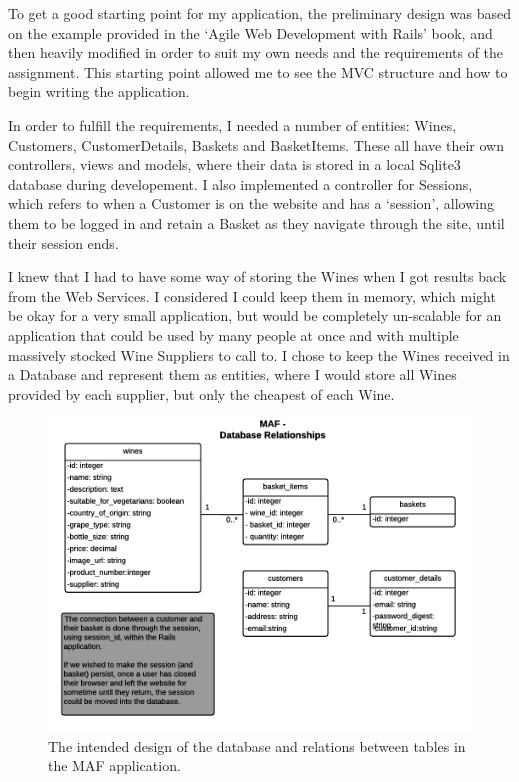 \documentclass[12pt]{article}
\begin{document}
To get a good starting point for my application, the preliminary design was based on the example provided in the `Agile Web Development with Rails'\cite{railsbook} book, and then heavily modified in order to suit my own needs and the requirements of the assignment. This starting point allowed me to see the MVC structure and how to begin writing the application.

In order to fulfill the requirements, I needed a number of entities: Wines, Customers, CustomerDetails, Baskets and BasketItems. These all have their own controllers, views and models, where their data is stored in a local Sqlite3 database during developement. I also implemented a controller for Sessions, which refers to when a Customer is on the website and has a `session', allowing them to be logged in and retain a Basket as they navigate through the site, until their session ends.

I knew that I had to have some way of storing the Wines when I got results back from the Web Services. I considered I could keep them in memory, which might be okay for a very small application, but would be completely un-scalable for an application that could be used by many people at once and with multiple massively stocked Wine Suppliers to call to. I chose to keep the Wines received in a Database and represent them as entities, where I would store all Wines provided by each supplier, but only the cheapest of each Wine.

\begin{figure}[H]
        \centering
                \includegraphics[width=1\textwidth]{assets/MAF_Database_relationships}
                \caption{The intended design of the database and relations between tables in the MAF application.}
                \label{fig: Intended MAF Database relationships.} 
\end{figure}
\end{document}
